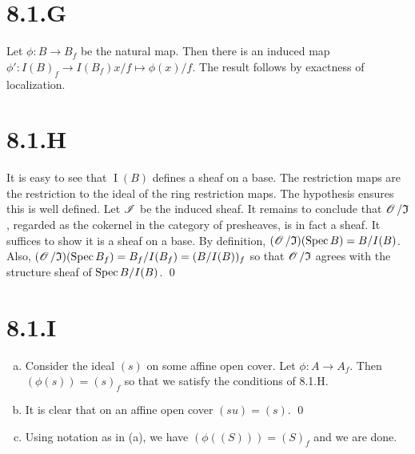 \documentclass{article}
\begin{document}
\section{8.1.G}
Let $\phi: B \to B_f$ be the natural map. Then there is an induced map
$\phi': I(B)_f \to I(B_f) x/f \mapsto \phi(x)/f$. The result follows by exactness of localization.

\section{8.1.H}
It is easy to see that $\operatorname{I}(B)$ defines a sheaf on a base. The
restriction maps are the restriction to the ideal of the ring restriction maps.
 The hypothesis ensures this is well defined. Let $\operatorname{\mathscr{I}}$ be the
induced sheaf. It remains to conclude that $\operatorname{\mathscr{O}} / \mathfrak{I}$, regarded as
the cokernel in the category of presheaves, is in fact a sheaf. It suffices to
show it is a sheaf on a base. By definition, $(\operatorname{\mathscr{O}} / \mathfrak{I})(\operatorname{Spec} B)=B/I(B)$. Also,
$(\operatorname{\mathscr{O}} / \mathfrak{I})(\operatorname{Spec} B_f)=B_f/I(B_f)=(B/I(B))_f$ so that $\operatorname{\mathscr{O}} / \mathfrak{I}$ agrees with the structure
sheaf of $\operatorname{Spec} B/I(B)$. \qed

\section{8.1.I}
\begin{enumerate}[a.]
    \item Consider the ideal $(s)$ on some affine open cover. Let
          $\phi: A \to A_f$. Then $(\phi(s))=(s)_f$ so that we satisfy the
          conditions of 8.1.H.
    \item It is clear that on an affine open cover $(su)=(s)$. \qed
    \item Using notation as in (a), we have $(\phi((S)))=(S)_f$ and we are done.
\end{enumerate}
\end{document}

